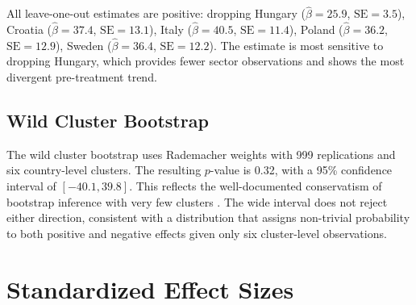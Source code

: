 \documentclass[12pt]{article}
\begin{document}
All leave-one-out estimates are positive: dropping Hungary ($\hat{\beta} = 25.9$, $\text{SE} = 3.5$), Croatia ($\hat{\beta} = 37.4$, $\text{SE} = 13.1$), Italy ($\hat{\beta} = 40.5$, $\text{SE} = 11.4$), Poland ($\hat{\beta} = 36.2$, $\text{SE} = 12.9$), Sweden ($\hat{\beta} = 36.4$, $\text{SE} = 12.2$). The estimate is most sensitive to dropping Hungary, which provides fewer sector observations and shows the most divergent pre-treatment trend.

\subsection{Wild Cluster Bootstrap}

The wild cluster bootstrap uses Rademacher weights with 999 replications and six country-level clusters. The resulting $p$-value is 0.32, with a 95\% confidence interval of $[-40.1, 39.8]$. This reflects the well-documented conservatism of bootstrap inference with very few clusters \citep{cameron2008bootstrap}. The wide interval does not reject either direction, consistent with a distribution that assigns non-trivial probability to both positive and negative effects given only six cluster-level observations.

\section{Standardized Effect Sizes}
\label{sec:sde}


\end{document}
